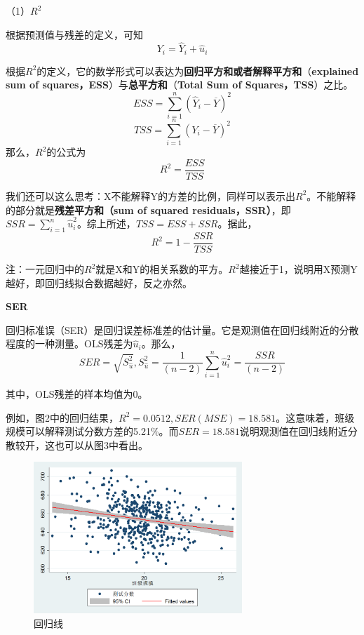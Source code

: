 \documentclass[cn,12pt,math=newtx,citestyle=gb7714-2015,bibstyle=gb7714-2015]{elegantbook}
\begin{document}
	（1）\textbf{$R^2$}
	
	根据预测值与残差的定义，可知
	\begin{equation}
		Y_i=\hat{Y}_i+\hat{u}_i
	\end{equation}
	
	根据$R^2$的定义，它的数学形式可以表达为\textbf{回归平方和或者解释平方和}（\textbf{explained sum of squares，ESS}）与\textbf{总平方和}（\textbf{Total Sum of Squares，TSS}）之比。
	\begin{equation}
		ESS=\sum_{i=1}^n{(\hat{Y}_i-\overline{Y})^2}
	\end{equation}
	\begin{equation}
		TSS=\sum_{i=1}^n{(Y_i-\overline{Y})^2}
	\end{equation}
	那么，$R^2$的公式为
	\begin{equation}
		R^2=\frac{ESS}{TSS}
	\end{equation}
	
	我们还可以这么思考：X不能解释Y的方差的比例，同样可以表示出$R^2$。不能解释的部分就是\textbf{残差平方和（sum of squared residuals，SSR）}，即$SSR=\sum_{i=1}^n{\hat{u}_i^2}$。综上所述，$TSS=ESS+SSR$。据此，
	\begin{equation}
		R^2=1-\frac{SSR}{TSS}
	\end{equation}
	
	注：一元回归中的$R^2$就是X和Y的相关系数的平方。$R^2$越接近于1，说明用X预测Y越好，即回归线拟合数据越好，反之亦然。
	
	\textbf{SER}
	
	回归标准误（SER）是回归误差标准差的估计量。它是观测值在回归线附近的分散程度的一种测量。OLS残差为$\hat{u}_i$。那么，
	\begin{equation}
		SER=\sqrt{S_{\hat{u}}^2},S_{\hat{u}}^2=\frac{1}{(n-2)}\sum_{i=1}^{n}{\hat{u}_i^2}=\frac{SSR}{(n-2)}
	\end{equation}
	
	其中，OLS残差的样本均值为0。
	
	例如，图2中的回归结果，$R^2=0.0512,SER(MSE)=18.581$。这意味着，班级规模可以解释测试分数方差的5.21\%。而$SER=18.581$说明观测值在回归线附近分散较开，这也可以从图3中看出。
	\begin{figure}[htbp]
		\centering
		\includegraphics[width=0.7\textwidth]{Rline.png}
		\caption{回归线}\label{fig:digit}
	\end{figure}
	
\end{document}
